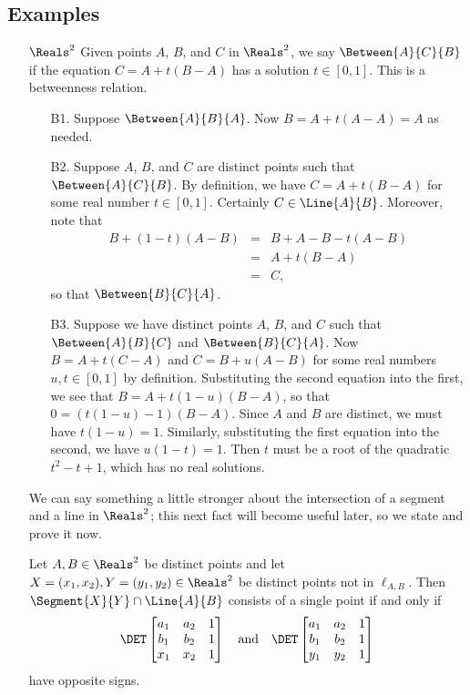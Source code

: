\documentclass{article}
\begin{document}
\subsection*{Examples}

\begin{itemize}
\item[$\Reals^2$] Given points $A$, $B$, and $C$ in $\Reals^2$, we say $\Between{A}{C}{B}$ if the equation $C = A + t(B-A)$ has a solution $t \in [0,1]$. This is a betweenness relation.
\begin{itemize}
\item[B1.] Suppose $\Between{A}{B}{A}$. Now $B = A + t(A - A) = A$ as needed.
\item[B2.] Suppose $A$, $B$, and $C$ are distinct points such that $\Between{A}{C}{B}$. By definition, we have $C = A + t(B-A)$ for some real number $t \in [0,1]$. Certainly $C \in \Line{A}{B}$. Moreover, note that
\begin{eqnarray*}
B + (1-t)(A-B) & = & B + A - B - t(A-B) \\
 & = & A + t(B-A) \\
 & = & C,
\end{eqnarray*}
so that $\Between{B}{C}{A}$.
\item[B3.] Suppose we have distinct points $A$, $B$, and $C$ such that $\Between{A}{B}{C}$ and $\Between{B}{C}{A}$.
Now $B = A + t(C-A)$ and $C = B + u(A-B)$ for some real numbers $u,t \in [0,1]$ by definition.
Substituting the second equation into the first, we see that $B = A + t(1-u)(B - A)$, so that $0 = (t(1-u) - 1)(B - A)$. Since $A$ and $B$ are distinct, we must have $t(1-u) = 1$. Similarly, substituting the first equation into the second, we have $u(1-t) = 1$. Then $t$ must be a root of the quadratic $t^2 - t + 1$, which has no real solutions.
\end{itemize}

We can say something a little stronger about the intersection of a segment and a line in $\Reals^2$; this next fact will become useful later, so we state and prove it now.

\begin{prop}
Let $A,B \in \Reals^2$ be distinct points and let $X = (x_1, x_2), Y = (y_1, y_2) \in \Reals^2$ be distinct points not in $\ell_{A,B}$. Then $\Segment{X}{Y} \cap \Line{A}{B}$ consists of a single point if and only if \[ \DET \begin{bmatrix} a_1 & a_2 & 1 \\ b_1 & b_2 & 1 \\ x_1 & x_2 & 1 \end{bmatrix} \quad \mathrm{and} \quad \DET \begin{bmatrix} a_1 & a_2 & 1 \\ b_1 & b_2 & 1 \\ y_1 & y_2 & 1 \end{bmatrix} \] have opposite signs.
\end{prop}


\end{itemize}
\end{document}
